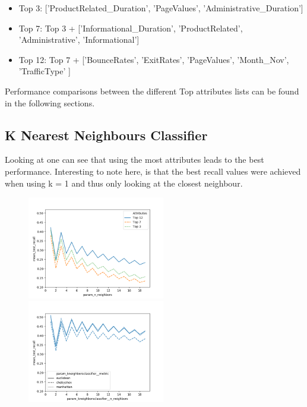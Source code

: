 \begin{itemize}
    \item Top 3: ['ProductRelated\_Duration', 'PageValues', 'Administrative\_Duration']
    \item Top 7: Top 3 + ['Informational\_Duration',  'ProductRelated', 'Administrative', 'Informational']
    \item Top 12: Top 7 +  ['BounceRates', 'ExitRates', 'PageValues', 'Month\_Nov', 'TrafficType' ]      
\end{itemize}
Performance comparisons between the different Top attributes lists can be found in the following sections.  



\subsection{K Nearest Neighbours Classifier}
Looking at  one can see that using the most attributes leads to the best performance.  Interesting to note here, is that the best recall values were achieved when using k = 1 and thus only looking at the closest neighbour. 

\begin{figure}
\begin{floatrow}
    {\includegraphics[width=6cm]{onlineshop/plots/knn_wo_preprocessing.png}\label{fig:knn_wo_pre}}
    {\includegraphics[width=6cm]{onlineshop/plots/knn_uniform_metric_comparison.png}\label{fig:knn_w_pre}}
\end{floatrow}
\end{figure}

